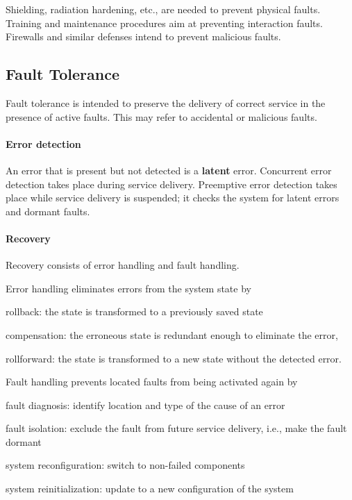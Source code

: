 Shielding, radiation hardening, etc., are needed to prevent physical faults.
Training and maintenance procedures aim at preventing interaction faults.
Firewalls and similar defenses intend to prevent malicious faults.

\subsection{Fault Tolerance}

Fault tolerance is intended to preserve the delivery of correct service in the presence of active faults.
This may refer to accidental or malicious faults.

\paragraph{Error detection}
An error that is present but not detected is a \textbf{latent} error. 
Concurrent error detection takes place during service delivery.
Preemptive error detection takes place while service delivery is suspended; it checks the
system for latent errors and dormant faults.

\paragraph{Recovery}
Recovery consists of error handling and fault handling.

Error handling eliminates errors from the system state by
\begin{compactitem}
  \item rollback: the state is transformed to a previously saved state
  \item compensation: the erroneous state is redundant enough to eliminate the error,
  \item rollforward: the state is transformed to a new state without the detected error.
\end{compactitem}

Fault handling prevents located faults from being activated again by
\begin{compactitem}
  \item fault diagnosis: identify location and type of the cause of an error
  \item fault isolation: exclude the fault from future service delivery, i.e., make the fault dormant
  \item system reconfiguration: switch to non-failed components
  \item system reinitialization: update to a new configuration of the system
\end{compactitem}

